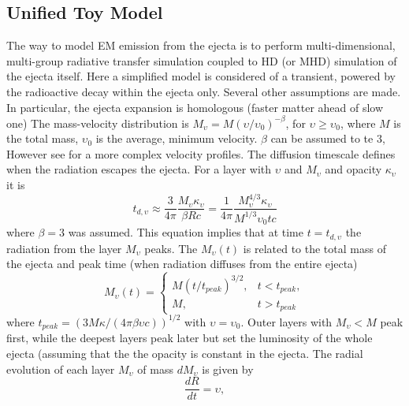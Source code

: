 \subsection{Unified Toy Model}
The way to model \ac{EM} emission from the ejecta is to perform multi-dimensional, 
multi-group radiative transfer simulation coupled to \ac{HD} (or \ac{MHD}) simulation of the ejecta itself.
%
Here a simplified model is considered of a transient, powered by the radioactive decay 
within the ejecta only. Several other assumptions are made. In particular, the ejecta expansion is homologous 
(faster matter ahead of slow one) \cite{Rosswog:2013kqa}%
The mass-velocity distribution is 
$M_{\upsilon} = M(\upsilon / \upsilon_0)^{-\beta}$, for $\upsilon \geq \upsilon_0$,
where $M$ is the total mass, $\upsilon_0$ is the average, minimum velocity. $\beta$ can be assumed to te $3$, 
\cite{Bauswein:2013yna}%
However see \cite{Piran:2012wd}%
for a more complex velocity profiles.
%
The diffusion timescale defines when the radiation escapes the ejecta. For a layer with 
$\upsilon$ and $M_{\upsilon}$ and opacity $\kappa_{\upsilon}$ it is 
%
\begin{equation}
t_{d,\upsilon} \approx \frac{3}{4\pi}\frac{M_{\upsilon}\kappa_{\upsilon}}{\beta Rc} = \frac{1}{4\pi}\frac{M_{\upsilon}^{4/3}\kappa_{\upsilon}}{M^{1/3}\upsilon_0 t c}
\end{equation}
%
where $\beta=3$ was assumed. 
%
This equation implies that at time $t=t_{d,\upsilon}$ the radiation from the layer $M_{\upsilon}$ peaks.
%
The $M_{\upsilon}(t)$ is related to the total mass of the ejecta and 
peak time (when radiation diffuses from the entire ejecta)
%
\begin{equation}
M_{\upsilon}(t) = 
\begin{cases}
M(t/t_{peak})^{3/2},& t<t_{peak}, \\
M, &t>t_{peak}
\end{cases}
\end{equation}
%
where $t_{peak} = (3M\kappa / (4\pi \beta \upsilon c))^{1/2}$ with 
$\upsilon = \upsilon_0$. 
%
Outer layers with $M_{\upsilon} < M$ peak first, while the deepest layers peak later but set the 
luminosity of the whole ejecta (assuming that the the opacity is constant in the ejecta. 
%
The radial evolution of each layer $M_{\upsilon}$ of mass $dM_{\upsilon}$ is given by 
%
\begin{equation}
\frac{dR}{dt} = \upsilon,
\end{equation}

